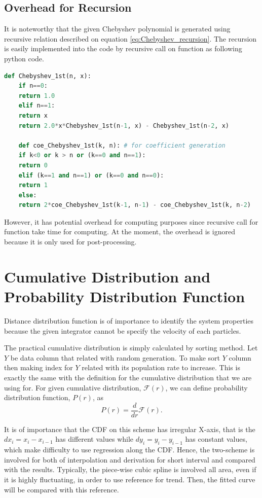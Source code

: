\documentclass[10pt, a4paper]{report}
\begin{document}
\begin{appendices}
  \section{Overhead for Recursion}
  It is noteworthy that the given Chebyshev polynomial is generated using recursive relation described on equation \eqref{eq:Chebyshev_recursion}. The recursion is easily implemented into the code by recursive call on function as following python code.

  \begin{lstlisting}[language=Python, frame=single]
    def Chebyshev_1st(n, x): 
    if n==0:
    return 1.0
    elif n==1:
    return x
    return 2.0*x*Chebyshev_1st(n-1, x) - Chebyshev_1st(n-2, x)

    def coe_Chebyshev_1st(k, n): # for coefficient generation
    if k<0 or k > n or (k==0 and n==1):
    return 0
    elif (k==1 and n==1) or (k==0 and n==0):
    return 1
    else:
    return 2*coe_Chebyshev_1st(k-1, n-1) - coe_Chebyshev_1st(k, n-2)
  \end{lstlisting}

  However, it has potential overhead for computing purposes since recursive call for function take time for computing. At the moment, the overhead is ignored because it is only used for post-processing. 


  \chapter{Cumulative Distribution and Probability Distribution Function}\label{appen_distance_distribution}
  Distance distribution function is of importance to identify the system properties because the given integrator cannot be specify the velocity of each particles. 

  The practical cumulative distribution is simply calculated by sorting method. Let $Y$ be data column that related with random generation. To make sort $Y$ column then making index for $Y$ related with its population rate to increase. This is exactly the same with the definition for the cumulative distribution that we are using for. For given cumulative distribution, $\mathscr{F}(r)$, we can define probability distribution function, $P(r)$, as
  \begin{equation}
    P(r) = \frac{d}{dr}\mathscr{F}(r).
  \end{equation}

  It is of importance that the CDF on this scheme has irregular X-axis, that is the $dx_i = x_i - x_{i-1}$ has different values while $dy_i = y_i - y_{i-1}$ has constant values, which make difficulty to use regression along the CDF. Hence, the two-scheme is involved for both of interpolation and derivation for short interval and compared with the results. Typically, the piece-wise cubic spline is involved all area, even if it is highly fluctuating, in order to use reference for trend. Then, the fitted curve will be compared with this reference.



\end{appendices}
\end{document}
